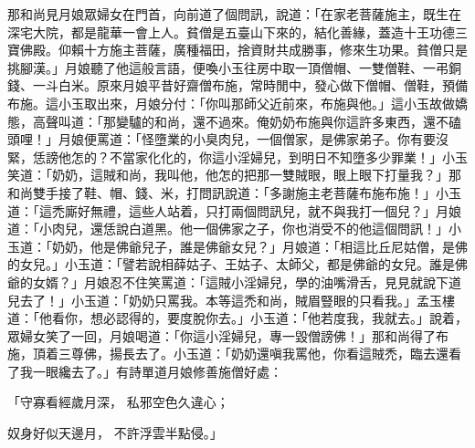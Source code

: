 \begin{showcontents}{}
那和尚見月娘眾婦女在門首，向前道了個問訊，說道：「在家老菩薩施主，既生在深宅大院，都是龍華一會上人。貧僧是五臺山下來的，結化善緣，蓋造十王功德三寶佛殿。仰賴十方施主菩薩，廣種福田，捨資財共成勝事，修來生功果。貧僧只是挑腳漢。」月娘聽了他這般言語，便喚小玉往房中取一頂僧帽、一雙僧鞋、一弔銅錢、一斗白米。原來月娘平昔好齋僧布施，常時閒中，發心做下僧帽、僧鞋，預備布施。這小玉取出來，月娘分付：「你叫那師父近前來，布施與他。」這小玉故做嬌態，高聲叫道：「那變驢的和尚，還不過來。俺奶奶布施與你這許多東西，還不磕頭哩！」月娘便罵道：「怪墮業的小臭肉兒，一個僧家，是佛家弟子。你有要沒緊，恁謗他怎的？不當家化化的，你這小淫婦兒，到明日不知墮多少罪業！」小玉笑道：「奶奶，這賊和尚，我叫他，他怎的把那一雙賊眼，眼上眼下打量我？」那和尚雙手接了鞋、帽、錢、米，打問訊說道：「多謝施主老菩薩布施布施！」小玉道：「這禿廝好無禮，這些人站着，只打兩個問訊兒，就不與我打一個兒？」月娘道：「小肉兒，還恁說白道黑。他一個佛家之子，你也消受不的他這個問訊！」小玉道：「奶奶，他是佛爺兒子，誰是佛爺女兒？」月娘道：「相這比丘尼姑僧，是佛的女兒。」小玉道：「譬若說相薛姑子、王姑子、太師父，都是佛爺的女兒。誰是佛爺的女婿？」月娘忍不住笑罵道：「這賊小淫婦兒，學的油嘴滑舌，見見就說下道兒去了！」小玉道：「奶奶只罵我。本等這禿和尚，賊眉豎眼的只看我。」孟玉樓道：「他看你，想必認得的，要度脫你去。」小玉道：「他若度我，我就去。」說着，眾婦女笑了一回，月娘喝道：「你這小淫婦兒，專一毀僧謗佛！」那和尚得了布施，頂着三尊佛，揚長去了。小玉道：「奶奶還嗔我罵他，你看這賊禿，臨去還看了我一眼纔去了。」有詩單道月娘修善施僧好處：

「守寡看經歲月深，  私邪空色久違心；

奴身好似天邊月，  不許浮雲半點侵。」


\end{showcontents}
